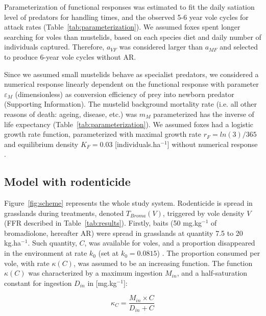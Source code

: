 \documentclass[11pt]{article}
\begin{document}
Parameterization of functional responses was estimated to fit the daily satiation level of predators for handling times, and the observed 5-6 year vole cycles for attack rates (Table~\ref{tab:parameterization}). We assumed foxes spent longer searching for voles than mustelids, based on each species diet and daily number of individuals captured. Therefore, $a_{VF}$ was considered larger than $a_{MF}$ and selected to produce 6-year vole cycles without AR.


Since we assumed small mustelids behave as specialist predators, we considered a numerical response linearly dependent on the functional response with parameter $\varepsilon_M$ (dimensionless) as conversion efficiency of prey into newborn predator (Supporting Information). The mustelid background mortality rate (i.e. all other reasons of death: ageing, disease, etc.) was $m_M$ parameterized has the inverse of life expectancy (Table~\ref{tab:parameterization}). 
We assumed foxes had a logistic growth rate function, parameterized with maximal growth rate $r_F = ln(3)/365$ and equilibrium density $K_F = 0.03$ [individuals.ha$^{-1}$] \citep{Ruette2003} without numerical response \citep{Weber2002}. 

\subsection{Model with rodenticide}

Figure~\ref{fig:scheme} represents the whole study system. Rodenticide is spread in grasslands during treatments, denoted $T_{Broma}(V)$, triggered by vole density $V$ (FFR described in Table~\ref{tab:results}).
%
Firstly, baits (50 mg.kg$^{-1}$  of bromadiolone, hereafter AR) were spread in grasslands at quantity 7.5 to 20 kg.ha$^{-1}$.
%
Such quantity, $C$, was available for voles, and a proportion disappeared in the environment at rate $k_0$ (set at $k_0 = 0.0815$) \citep{Sage2008}. The proportion consumed per vole, with rate $\kappa(C)$, was assumed to be an increasing function. The function $\kappa(C)$ was characterized by a maximum ingestion $M_{in}$, and a half-saturation constant for ingestion $D_{in}$ in [mg.kg$^{-1}$]:

\begin{equation}
\kappa_C= \dfrac{M_{in}\times C}{D_{in} + C}
\end{equation}
\end{document}
